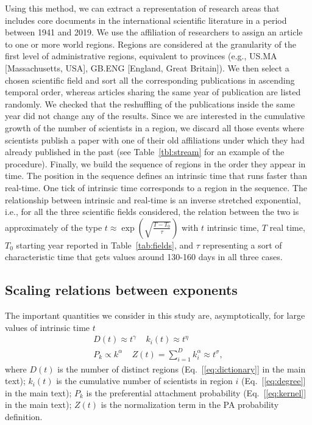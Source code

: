 \documentclass[draft,final]{vutinfth} %
\begin{document}
Using this method, we can extract a representation of research areas that includes core documents in the international scientific literature in a period between 1941 and 2019. 
We use the affiliation of researchers to assign an article to one or more world regions.
Regions are considered at the granularity of the first level of administrative regions, equivalent to provinces (e.g., US.MA [Massachusetts, USA], GB.ENG [England, Great Britain]).
We then select a chosen scientific field and sort all the corresponding publications in ascending temporal order, whereas articles sharing the same year of publication are listed randomly.
%
We checked that the reshuffling of the publications inside the same year did not change any of the results.
%
Since we are interested in the cumulative growth of the number of scientists in a region, we discard all those events where scientists publish a paper with one of their old affiliations under which they had already published in the past (see Table~\ref{tbl:stream} for an example of the procedure).
Finally, we build the sequence of regions in the order they appear in time.
The position in the sequence defines an intrinsic time that runs faster than real-time.
One tick of intrinsic time corresponds to a region in the sequence.
The relationship between intrinsic and real-time is an inverse stretched exponential, i.e., for all the three scientific fields considered, the relation between the two is approximately of the type 
\(t \approx \exp(\sqrt{\frac{T-T_0}{\tau}})\)
with $t$ intrinsic time, $T$ real time, $T_0$ starting year reported in Table~\ref{tab:fields}, and $\tau$ representing a sort of characteristic time that gets values around 130-160 days in all three cases.

\subsection{Scaling relations between exponents}
\label{app:scaling}

The important quantities we consider in this study are, asymptotically, for large values of intrinsic time $t$
\begin{equation}
\begin{array}{l}
    D(t) \approx t^\gamma ~~~~~ k_i(t) \approx t^\eta \\%
     P_k \propto k^\alpha ~~~~~ Z(t) = \sum_{i=1}^D k_i^\alpha \approx t^\sigma,
     \label{eq:exponent_definition}
\end{array}
\end{equation}
where 
$D(t)$ is the number of distinct regions (Eq.~[\ref{eq:dictionary}] in the main text); 
$k_i(t)$ is the cumulative number of  scientists in region $i$ (Eq.~[\ref{eq:degree}] in the main text); 
$P_k$ is the preferential attachment probability (Eq.~[\ref{eq:kernel}] in the main text);
$Z(t)$ is the normalization term in the PA probability definition.
\end{document}
